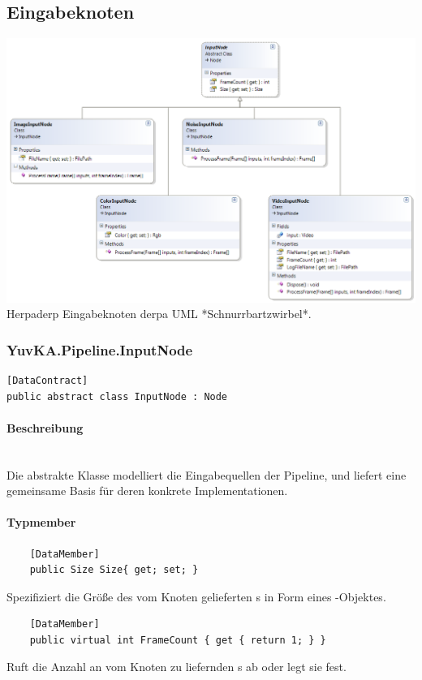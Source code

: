 	\subsection{Eingabeknoten}

\includegraphics[width=\textwidth]{YuvKa.Pipeline/inputnodes.png}
Herpaderp Eingabeknoten derpa UML *Schnurrbartzwirbel*.

\subsubsection{YuvKA.Pipeline.InputNode}

\begin{verbatim}
[DataContract]
public abstract class InputNode : Node
\end{verbatim}

\paragraph{Beschreibung}~\\
Die abstrakte Klasse  modelliert die Eingabequellen der Pipeline, und liefert eine gemeinsame Basis für deren konkrete Implementationen.

\paragraph{Typmember}
\begin{itemize}

	\begin{verbatim}
	[DataMember]
	public Size Size{ get; set; }
	\end{verbatim}
	Spezifiziert die Größe des vom Knoten gelieferten s in Form eines -Objektes.

	\begin{verbatim}
	[DataMember]
	public virtual int FrameCount { get { return 1; } }
	\end{verbatim}
	Ruft die Anzahl an vom Knoten zu liefernden s ab oder legt sie fest.

\end{itemize}


